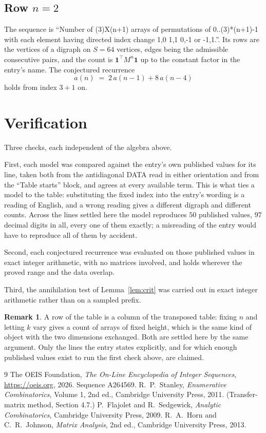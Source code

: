 \documentclass[11pt,a4paper]{article}
\theoremstyle{plain}
\theoremstyle{definition}
\newtheorem{remark}[theorem]{Remark}
\begin{document}
\subsection*{Row $n$$=2$}
The sequence is ``Number of (3)X(n+1) arrays of permutations of 0..(3)*(n+1)-1 with each element having directed index change 1,0 1,1 0,-1 or -1,1.''. Its rows are the vertices of a digraph on
$S=64$ vertices, edges being the admissible consecutive pairs, and the count is
$\mathbf{1}^{\!\top}M^{n}\mathbf{1}$ up to the constant factor in the entry's name.
The conjectured recurrence
\[
a(n)\;=\;2\,a(n-1) + 8\,a(n-4)
\]
holds from index $3+1$ on.

\section{Verification}

Three checks, each independent of the algebra above.

First, each model was compared against the entry's own published values for its line, taken
both from the antidiagonal DATA read in either orientation and from the ``Table starts''
block, and agrees at every available term. This is what ties a model to the table:
substituting the fixed index into the entry's wording is a reading of English, and a wrong
reading gives a different digraph and different counts. Across the lines settled here the
model reproduces $50$ published values, $97$ decimal digits in all, every one of
them exactly; a misreading of the entry would have to reproduce all of them by accident.

Second, each conjectured recurrence was evaluated on those published values in exact
integer arithmetic, with no matrices involved, and holds wherever the proved range and the
data overlap.

Third, the annihilation test of Lemma~\ref{lem:crit} was carried out in exact integer
arithmetic rather than on a sampled prefix.

\begin{remark}
A row of the table is a column of the transposed table: fixing $n$ and letting $k$ vary gives a
count of arrays of fixed height, which is the same kind of object with the two dimensions
exchanged. Both are settled here by the same argument. Only the lines the entry states
explicitly, and for which enough published values exist to run the first check above, are
claimed.
\end{remark}

\begin{thebibliography}{9}
 The OEIS Foundation, \emph{The On-Line Encyclopedia of Integer
Sequences}, \url{https://oeis.org}, 2026. Sequence A264569.
 R.~P.~Stanley, \emph{Enumerative Combinatorics}, Volume 1, 2nd ed.,
Cambridge University Press, 2011. (Transfer-matrix method, Section 4.7.)
 P.~Flajolet and R.~Sedgewick, \emph{Analytic Combinatorics}, Cambridge
University Press, 2009.
 R.~A.~Horn and C.~R.~Johnson, \emph{Matrix Analysis}, 2nd ed., Cambridge
University Press, 2013.
\end{thebibliography}
\end{document}
